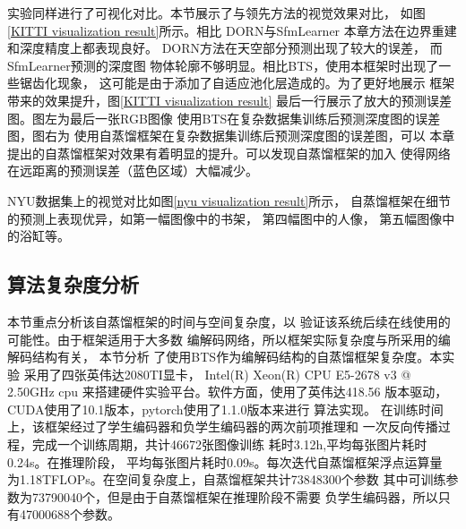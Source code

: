 实验同样进行了可视化对比。本节展示了与领先方法的视觉效果对比，
如图\ref{KITTI visualization result}所示。相比
DORN\cite{FuCVPR18-DORN}与SfmLearner\cite{zhou2017unsupervised}
本章方法在边界重建和深度精度上都表现良好。
DORN\cite{FuCVPR18-DORN}方法在天空部分预测出现了较大的误差，
而SfmLearner\cite{zhou2017unsupervised}预测的深度图
物体轮廓不够明显。相比BTS\cite{bts}，使用本框架时出现了一些锯齿化现象，
这可能是由于添加了自适应池化层造成的。为了更好地展示
框架带来的效果提升，图\ref{KITTI visualization result}
最后一行展示了放大的预测误差图。图左为最后一张RGB图像
使用BTS在复杂数据集训练后预测深度图的误差图，图右为
使用自蒸馏框架在复杂数据集训练后预测深度图的误差图，可以
本章提出的自蒸馏框架对效果有着明显的提升。可以发现自蒸馏框架的加入
使得网络在远距离的预测误差（蓝色区域）大幅减少。

NYU数据集上的视觉对比如图\ref{nyu visualization result}所示，
自蒸馏框架在细节的预测上表现优异，如第一幅图像中的书架，
第四幅图中的人像，
第五幅图像中的浴缸等。

\subsection{算法复杂度分析}
本节重点分析该自蒸馏框架的时间与空间复杂度，以
验证该系统后续在线使用的可能性。由于框架适用于大多数
编解码网络，所以框架实际复杂度与所采用的编解码结构有关，
本节分析
了使用BTS\cite{bts}作为编解码结构的自蒸馏框架复杂度。本实验
采用了四张英伟达2080TI显卡，
Intel(R) Xeon(R) CPU E5-2678 v3 @ 2.50GHz cpu
来搭建硬件实验平台。软件方面，使用了英伟达418.56
版本驱动，CUDA使用了10.1版本，pytorch使用了1.1.0版本来进行
算法实现。
在训练时间上，该框架经过了学生编码器和负学生编码器的两次前项推理和
一次反向传播过程，完成一个训练周期，共计46672张图像训练
耗时3.12h,平均每张图片耗时0.24s。在推理阶段，
平均每张图片耗时0.09s。每次迭代自蒸馏框架浮点运算量
为1.18TFLOPs。在空间复杂度上，自蒸馏框架共计73848300个参数
其中可训练参数为73790040个，但是由于自蒸馏框架在推理阶段不需要
负学生编码器，所以只有47000688个参数。

